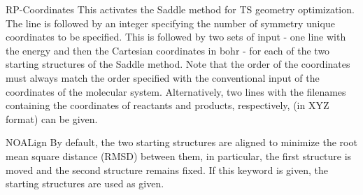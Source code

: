 \begin{keywordlist}

\item[RP-Coordinates]
This activates the Saddle method for TS geometry optimization.
The line is followed by an integer specifying the number of symmetry unique coordinates to be specified. This
is followed by two sets of input - one line with the energy and then the Cartesian coordinates in bohr - for
each of the two starting structures of the Saddle method. Note that the order of the coordinates must always
match the order specified with the conventional input of the coordinates of the molecular system.
Alternatively, two lines with the filenames containing the coordinates of reactants and products, respectively,
(in XYZ format) can be given.

\item[NOALign]
By default, the two starting structures are aligned to minimize the root mean square distance (RMSD) between them,
in particular, the first structure is moved and the second structure remains fixed.
If this keyword is given, the starting structures are used as given.


\end{keywordlist}
